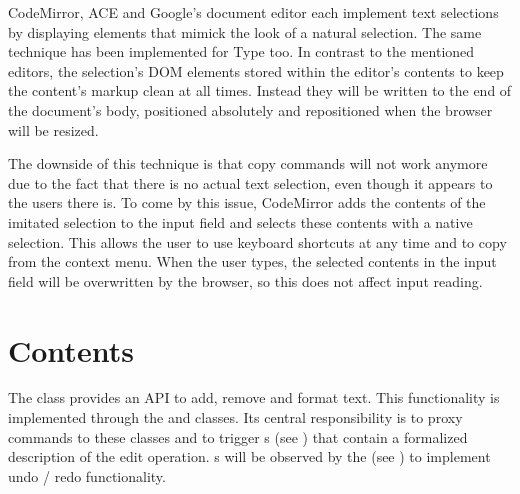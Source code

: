CodeMirror, ACE and Google's document editor each implement text selections by displaying  elements that mimick the look of a natural selection. The same technique has been implemented for Type too. In contrast to the mentioned editors, the selection's DOM elements stored within the editor's contents to keep the content's markup clean at all times. Instead they will be written to the end of the document's body, positioned absolutely and repositioned when the browser will be resized.

The downside of this technique is that copy commands will not work anymore due to the fact that there is no actual text selection, even though it appears to the users there is. To come by this issue, CodeMirror adds the contents of the imitated selection to the input field and selects these contents with a native selection. This allows the user to use keyboard shortcuts at any time and to copy from the context menu. When the user types, the selected contents in the input field will be overwritten by the browser, so this does not affect input reading.





\section{Contents}
\label{sec:contents_impl}

The  class provides an API to add, remove and format text. This functionality is implemented through the  and  classes. Its central responsibility is to proxy commands to these classes and to trigger s (see ) that contain a formalized description of the edit operation. s will be observed by the  (see ) to implement undo / redo functionality.


